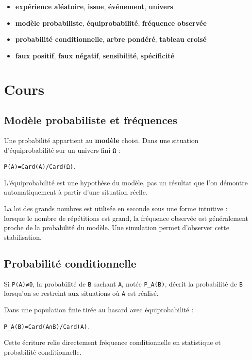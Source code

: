\begin{itemize}
\item \textbf{expérience aléatoire}, \textbf{issue}, \textbf{événement}, \textbf{univers}
\item \textbf{modèle probabiliste}, \textbf{équiprobabilité}, \textbf{fréquence observée}
\item \textbf{probabilité conditionnelle}, \textbf{arbre pondéré}, \textbf{tableau croisé}
\item \textbf{faux positif}, \textbf{faux négatif}, \textbf{sensibilité}, \textbf{spécificité}
\end{itemize}

\section{Cours}

\subsection{Modèle probabiliste et fréquences}

Une probabilité appartient au \textbf{modèle} choisi. Dans une situation d'équiprobabilité sur un univers fini \texttt{Ω} :

\texttt{P(A)=Card(A)/Card(Ω)}.

L'équiprobabilité est une hypothèse du modèle, pas un résultat que l'on démontre automatiquement à partir d'une situation réelle.

La loi des grands nombres est utilisée en seconde sous une forme intuitive : lorsque le nombre de répétitions est grand, la fréquence observée est généralement proche de la probabilité du modèle. Une simulation permet d'observer cette stabilisation.

\subsection{Probabilité conditionnelle}

Si \texttt{P(A)≠0}, la probabilité de \texttt{B} sachant \texttt{A}, notée \texttt{P_A(B)}, décrit la probabilité de \texttt{B} lorsqu'on se restreint aux situations où \texttt{A} est réalisé.

Dans une population finie tirée au hasard avec équiprobabilité :

\texttt{P_A(B)=Card(A∩B)/Card(A)}.

Cette écriture relie directement fréquence conditionnelle en statistique et probabilité conditionnelle.

